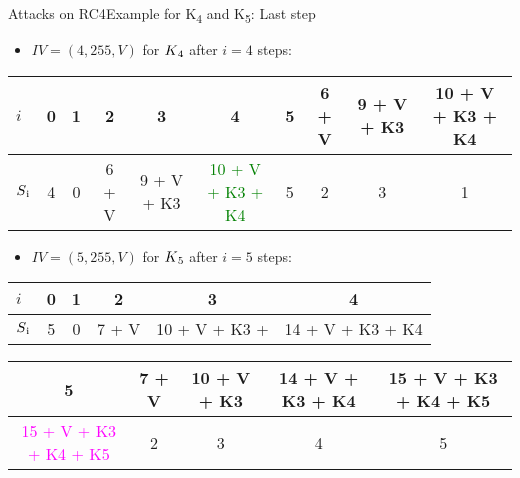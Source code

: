 \documentclass[
	aspectratio=169,	%
	onlytextwidth,		%
	t					%
	]{beamer}
\begin{document}
\begin{frame}[fragile]{Attacks on RC4}{Example for K\textsubscript{4} and K\textsubscript{5}: Last step}
	\begin{itemize}
		\item $IV = (4,255,V)$ for $K\textsubscript{4}$ after $i=4$ steps:
	\end{itemize}

	\small
	
	\begin{table}[h!]
		\begin{center}
			\begin{tabular}{l|c|c|c|c|c|c|c|c|c}
			$i$ & 0 & 1 & 2 & 3 & 4 & 5 & 6 + V & 9 + V + K3 & 10 + V + K3 + K4\\
			\hline
			$S\textsubscript{i}$ & 4 & 0 & 6 + V & 9 + V + K3 & \textcolor{green}{10 + V + K3 + K4} & 5 & 2 & 3 & 1\\
			\end{tabular}
		\end{center}
	\end{table}

	\normalsize

	\begin{itemize}
		\item $IV = (5,255,V)$ for $K\textsubscript{5}$ after $i=5$ steps:
	\end{itemize}

	\small

	\begin{table}[h!]
		\begin{center}
			\begin{tabular}{l|c|c|c|c|c}
			$i$ & 0 & 1 & 2 & 3 & 4\\
			\hline
			$S\textsubscript{i}$ & 5 & 0 & 7 + V & 10 + V + K3 + & 14 + V + K3 + K4\\
			\end{tabular}
		\end{center}
	\end{table}

	\begin{table}[h!]
		\begin{center}
			\begin{tabular}{c|c|c|c|c}
			5 & 7 + V & 10 + V + K3 & 14 + V + K3 + K4 & 15 + V + K3 + K4 + K5\\
			\hline
			\textcolor{magenta}{15 + V + K3 + K4 + K5} & 2 & 3 & 4 & 5\\
			\end{tabular}
		\end{center}
	\end{table}

	\normalsize

\end{frame}
\end{document}
